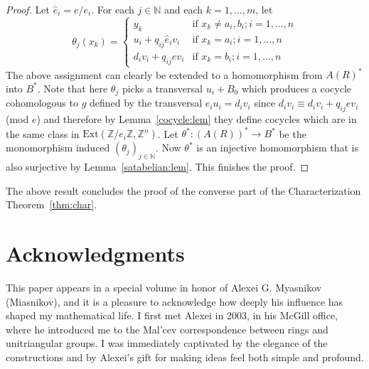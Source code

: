 \documentclass{article}
\theoremstyle{remark}
\def\N{{\mathbb{N}}}
\def\Z{{\mathbb{Z}}}
\def\Ext{\text{Ext}}
\begin{document}
\begin{proof}
       Let $\hat{e}_i=e/e_i$. For each $j\in\N$ and each $k=1, \ldots ,m$, let
\begin{equation*}
  \theta_j(x_k)=\left\{
  \begin{array}{ll}
   y_k & \text{if } x_k\neq a_i, b_i; i=1, \ldots ,n \\
  u_i+ q_{ij}\hat{e}_iv_i& \text{if } x_k=a_i; i=1,\ldots, n\\
  d_iv_i+ q_{ij}ev_i & \text{if } x_k=b_i; i=1,\ldots, n\end{array}\right.
   \end{equation*}
 The above assignment can clearly be extended to a homomorphism from $A(R)^*$ into $B^*$. Note that here $\theta_j$ picks a transversal $u_i+B_0$ which produces a cocycle cohomologous to $g$ defined by the transversal $e_iu_i= d_iv_i$ since $d_iv_i \equiv d_iv_i+ q_{ij}ev_i$ (mod $e$) and therefore by Lemma~\ref{cocycle:lem} they define cocycles which are in the same class in $\Ext(\Z/e_i\Z, \Z^n)$. Let $\theta^*:(A(R))^*\to B^*$ be the monomorphism induced $(\theta_j)_{j\in \N}$. Now $\theta^*$ is an injective homomorphism that is also surjective by Lemma~\ref{satabelian:lem}. This finishes the proof.
\end{proof}
The above result concludes the proof of the converse part of the Characterization Theorem~\ref{thm:char}.

\section*{Acknowledgments}
This paper appears in a special volume in honor of Alexei G. Myasnikov (Miasnikov), and it is a pleasure to acknowledge how deeply his influence has shaped my mathematical life. I first met Alexei in 2003, in his McGill office, where he introduced me to the Mal'cev correspondence between rings and unitriangular groups. I was immediately captivated by the elegance of the constructions and by Alexei's gift for making ideas feel both simple and profound.
\end{document}
